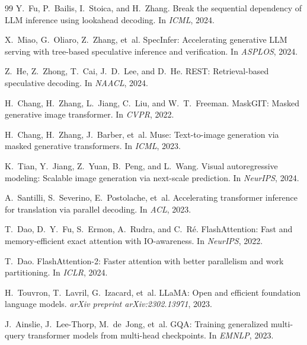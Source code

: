 \documentclass[10pt, twocolumn]{article}
\begin{document}
\begin{thebibliography}{99}
Y.~Fu, P.~Bailis, I.~Stoica, and H.~Zhang.
\newblock Break the sequential dependency of LLM inference using lookahead decoding.
\newblock In \emph{ICML}, 2024.

X.~Miao, G.~Oliaro, Z.~Zhang, et~al.
\newblock SpecInfer: Accelerating generative LLM serving with tree-based speculative inference and verification.
\newblock In \emph{ASPLOS}, 2024.

Z.~He, Z.~Zhong, T.~Cai, J.~D.~Lee, and D.~He.
\newblock REST: Retrieval-based speculative decoding.
\newblock In \emph{NAACL}, 2024.

H.~Chang, H.~Zhang, L.~Jiang, C.~Liu, and W.~T.~Freeman.
\newblock MaskGIT: Masked generative image transformer.
\newblock In \emph{CVPR}, 2022.

H.~Chang, H.~Zhang, J.~Barber, et~al.
\newblock Muse: Text-to-image generation via masked generative transformers.
\newblock In \emph{ICML}, 2023.

K.~Tian, Y.~Jiang, Z.~Yuan, B.~Peng, and L.~Wang.
\newblock Visual autoregressive modeling: Scalable image generation via next-scale prediction.
\newblock In \emph{NeurIPS}, 2024.

A.~Santilli, S.~Severino, E.~Postolache, et~al.
\newblock Accelerating transformer inference for translation via parallel decoding.
\newblock In \emph{ACL}, 2023.

T.~Dao, D.~Y.~Fu, S.~Ermon, A.~Rudra, and C.~R\'e.
\newblock FlashAttention: Fast and memory-efficient exact attention with IO-awareness.
\newblock In \emph{NeurIPS}, 2022.

T.~Dao.
\newblock FlashAttention-2: Faster attention with better parallelism and work partitioning.
\newblock In \emph{ICLR}, 2024.

H.~Touvron, T.~Lavril, G.~Izacard, et~al.
\newblock LLaMA: Open and efficient foundation language models.
\newblock \emph{arXiv preprint arXiv:2302.13971}, 2023.

J.~Ainslie, J.~Lee-Thorp, M.~de~Jong, et~al.
\newblock GQA: Training generalized multi-query transformer models from multi-head checkpoints.
\newblock In \emph{EMNLP}, 2023.

\end{thebibliography}
\end{document}
